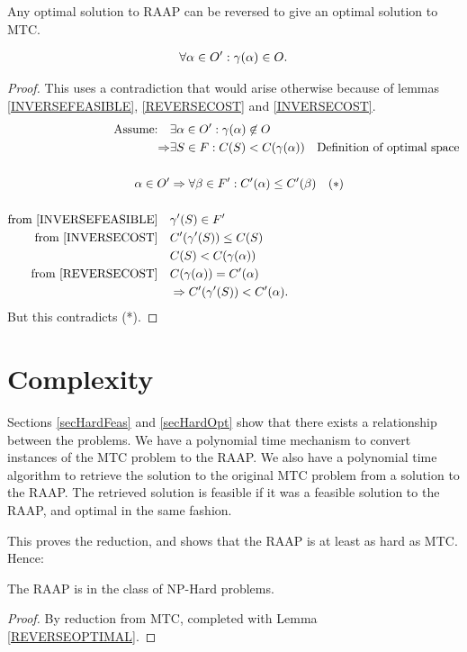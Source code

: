 \begin{lemma}
\label{REVERSEOPTIMAL}
Any optimal solution to RAAP can be reversed to give an optimal solution to MTC.

\begin{align}
	\nonumber \forall \alpha \in O' : \gamma(\alpha) \in O.
\end{align}
\end{lemma}

\begin{proof}
This uses a contradiction that would arise otherwise because of lemmas \ref{INVERSEFEASIBLE}, \ref{REVERSECOST} and \ref{INVERSECOST}.
\begin{align}
	\nonumber \mbox{Assume:} \quad & \exists \alpha \in O' : \gamma(\alpha) \not\in O \\
	\nonumber \Rightarrow & \exists S \in F : C(S) < C(\gamma(\alpha)) \quad \mbox{Definition of optimal space} \\
	\nonumber \\
	\nonumber \alpha \in O' & \Rightarrow \forall \beta \in F' : C'(\alpha) \leq C'(\beta) \quad (*)\\
	\nonumber \\
	\nonumber \mbox{from \ref{INVERSEFEASIBLE}}\quad & \gamma'(S) \in F' \\
	\nonumber \mbox{from \ref{INVERSECOST}}\quad & C'(\gamma'(S)) \leq C(S) \\
	\nonumber & C(S) < C(\gamma(\alpha)) \\
	\nonumber \mbox{from \ref{REVERSECOST}}\quad & C(\gamma(\alpha)) = C'(\alpha)\\
	\nonumber & \Rightarrow C'(\gamma'(S)) < C'(\alpha).
\end{align}
But this contradicts (*).

\end{proof}

\section{Complexity}

Sections \ref{secHardFeas} and \ref{secHardOpt} show that there exists a relationship between the problems.
We have a polynomial time mechanism to convert instances of the MTC problem to the RAAP.
We also have a polynomial time algorithm to retrieve the solution to the original MTC problem from a solution to the RAAP.
The retrieved solution is feasible if it was a feasible solution to the RAAP, and optimal in the same fashion.

This proves the reduction, and shows that the RAAP is at least as hard as MTC.
Hence:
\begin{theorem}
The RAAP is in the class of NP-Hard problems.
\end{theorem}
\begin{proof}
By reduction from MTC, completed with Lemma \ref{REVERSEOPTIMAL}.
\end{proof}